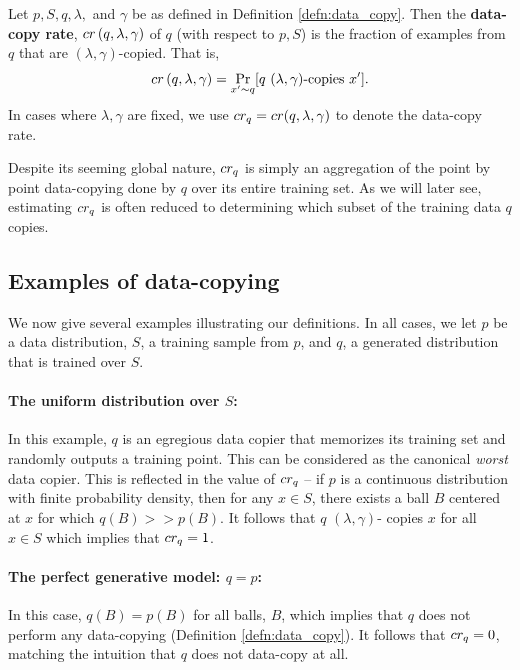\begin{definition}
Let $p, S, q, \lambda,$ and $\gamma$ be as defined in Definition \ref{defn:data_copy}. Then the \textbf{data-copy rate}, $cr\left(q, \lambda, \gamma\right)$ of $q$ (with respect to $p, S$) is the fraction of examples from $q$ that are $(\lambda, \gamma)$-copied. That is, $$cr\left(q, \lambda, \gamma\right) = \Pr_{x' \sim q}[q\text{ }(\lambda,\gamma)\text{-copies }x'].$$ In cases where $\lambda, \gamma$ are fixed, we use $cr_q = cr(q, \lambda, \gamma)$ to denote the data-copy rate.
\end{definition}

Despite its seeming global nature, $cr_q$ is simply an aggregation of the point by point data-copying done by $q$ over its entire training set. As we will later see, estimating $cr_q$ is often reduced to determining which subset of the training data $q$ copies. 

\subsection{Examples of data-copying}

We now give several examples illustrating our definitions. In all cases, we let $p$ be a data distribution, $S$, a training sample from $p$, and $q$, a generated distribution that is trained over $S$. 

\paragraph{The uniform distribution over $S$:} In this example, $q$ is an egregious data copier that memorizes its training set and randomly outputs a training point. This can be considered as the canonical \textit{worst} data copier. This is reflected in the value of $cr_q$ -- if $p$ is a continuous distribution with finite probability density, then for any $x \in S$, there exists a ball $B$ centered at $x$ for which $q(B) >> p(B)$. It follows that $q$ $(\lambda,\gamma)$- copies $x$ for all $x \in S$ which implies that $cr_q = 1$.

\paragraph{The perfect generative model: $q = p$:} In this case, $q(B) = p(B)$ for all balls, $B$, which implies that $q$ does not perform any data-copying (Definition \ref{defn:data_copy}). It follows that $cr_q = 0$, matching the intuition that $q$ does not data-copy at all.

